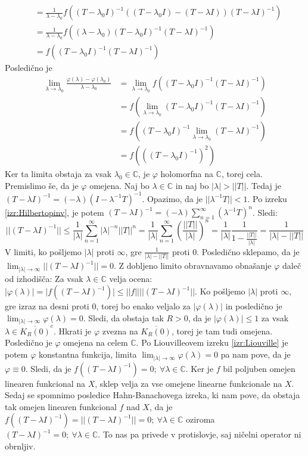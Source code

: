 \documentclass[mat2]{matdelo}
\newcommand{\C}{\mathbb{C}}
\newcommand{\abs}[1]{\ensuremath{\lvert #1 \rvert}}
\newcommand{\norm}[1]{\abs{\abs{#1}}}
\begin{document}
\begin{dokaz}
\begin{enumerate}[a)]
\begin{align*}
					&= \frac{1}{\lambda - \lambda_0}f((T-\lambda_0 I)^{-1}\left((T-\lambda_0 I) - (T-\lambda I)\right)(T-\lambda I)^{-1}) \\
					&= \frac{1}{\lambda - \lambda_0}f((\lambda - \lambda_0)(T-\lambda_0 I)^{-1}(T-\lambda I)^{-1}) \\
					&= f((T-\lambda_0 I)^{-1}(T-\lambda I)^{-1})
				\end{align*}
				Posledično je \begin{align*}
					\lim_{\lambda\to \lambda_0}\frac{\varphi(\lambda)-\varphi(\lambda_0)}{\lambda - \lambda_0} &= \lim_{\lambda\to\lambda_0}f((T-\lambda_0 I)^{-1}(T-\lambda I)^{-1}) \\
					&= f(\lim_{\lambda\to \lambda_0}(T-\lambda_0 I)^{-1}(T-\lambda I)^{-1}) \\
					&= f((T-\lambda_0 I)^{-1}\lim_{\lambda\to \lambda_0}(T-\lambda I)^{-1}) \\
					&= f(((T-\lambda_0 I)^{-1})^2)
				\end{align*}
				Ker ta limita obstaja za vsak $\lambda_0\in\C$, je $\varphi$ holomorfna na $\C$, torej cela. Premislimo še, da je $\varphi$ omejena.
				Naj bo $\lambda\in\C$ in naj bo $\abs{\lambda}>\norm{T}$. Tedaj je $(T- \lambda I)^{-1} = (-\lambda)(I - \lambda^{-1}T)^{-1}$. Opazimo, da je $\norm{\lambda^{-1}T}<1$. Po izreku \ref{izr:Hilbertopinv}, je potem $(T- \lambda I)^{-1} = (-\lambda)\sum_{n = 1}^{\infty}(\lambda^{-1}T)^n$. Sledi: $$\norm{(T- \lambda I)^{-1}} \leq\frac{1}{\abs{\lambda}}\sum_{n = 1}^{\infty}\abs{\lambda}^{-n}\norm{T}^n = \frac{1}{\abs{\lambda}}\sum_{n=1}^{\infty}\left(\frac{\norm{T}}{\abs{\lambda}}\right)^n = \frac{1}{\abs{\lambda}}\frac{1}{1-\frac{\norm{T}}{\abs{\lambda}}}=\frac{1}{\abs{\lambda}-\norm{T}}$$
				V limiti, ko pošljemo $\abs{\lambda}$ proti $\infty$, gre $\frac{1}{\abs{\lambda} - \norm{T}}$ proti $0$. Posledično sklepamo, da je $\lim_{\abs{\lambda}\to\infty}\norm{(T- \lambda I)^{-1}} = 0$. Z dobljeno limito obravnavamo obnašanje $\varphi$ daleč od izhodišča: Za vsak $\lambda\in\C$ velja ocena: $\abs{\varphi(\lambda)} = \abs{f((T-\lambda I)^{-1})} \leq \norm{f}\norm{(T-\lambda I)^{-1}}$. Ko pošljemo $\abs{\lambda}$ proti $\infty$, gre izraz na desni proti $0$, torej bo enako veljalo za $\abs{\varphi(\lambda)}$ in posledično je $\lim_{\abs{\lambda}\to\infty}\varphi(\lambda)=0$. Sledi, da obstaja tak $R>0$, da je $\abs{\varphi(\lambda)}\leq 1$ za vsak $\lambda\in \overline{K_R(0)}^c$. Hkrati je $\varphi$ zvezna na $\overline{K_R(0)}$, torej je tam tudi omejena. Posledično je $\varphi$ omejena na celem $\C$.
				Po Liouvilleovem izreku \ref{izr:Liouville} je potem $\varphi$ konstantna funkcija, limita $\lim_{\abs{\lambda}\to\infty}\varphi(\lambda) = 0$ pa nam pove, da je $\varphi\equiv 0$. Sledi, da je $f((T - \lambda I)^{-1})=0;~\forall \lambda\in\C$. Ker je $f$ bil poljuben omejen linearen funkcional na $X$, sklep velja za vse omejene linearne funkcionale na $X$. Sedaj se spomnimo posledice Hahn-Banachovega izreka, ki nam pove, da obstaja tak omejen linearen funkcional $f$ nad $X$, da je $f((T- \lambda I)^{-1})=\norm{(T- \lambda I)^{-1}}=0;~\forall \lambda\in\C$ oziroma $(T- \lambda I)^{-1} = 0;~ \forall \lambda\in\C$. To nas pa privede v protislovje, saj ničelni operator ni obrnljiv.

\end{enumerate}
\end{dokaz}
\end{document}
